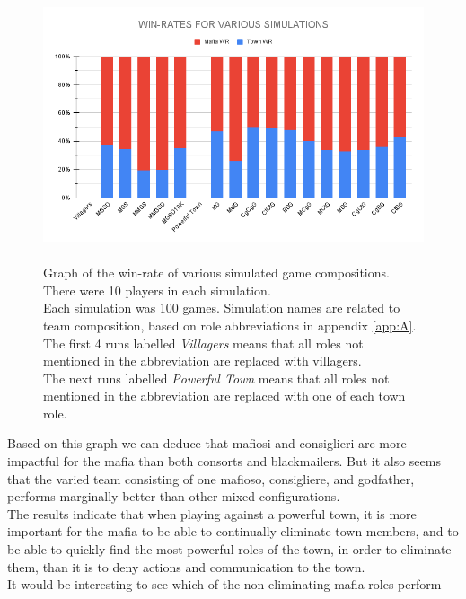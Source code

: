 \begin{figure}[H]
    \includegraphics[width=1\linewidth]{figures/Winrates}
    \caption{\\Graph of the win-rate of various simulated game compositions.\\
        There were 10 players in each simulation.\\
        Each simulation was 100 games.
        Simulation names are related to team composition, based on role
        abbreviations in appendix \ref{app:A}.\\
        The first 4 runs labelled \textit{Villagers} means that all roles not
        mentioned in the abbreviation are replaced with villagers.\\
        The next runs labelled \textit{Powerful Town} means that all roles not
        mentioned in the abbreviation are replaced with	one of each town role.}
    \label{fig:VariousSimulations}
\end{figure}
\vspace{-5px}Based on this graph we can deduce that mafiosi and
consiglieri are more
impactful for the mafia than both consorts and blackmailers. But it also seems
that the varied team consisting of one mafioso, consigliere, and godfather,
performs marginally better than other mixed configurations. \\
The results indicate  that when playing against a powerful town, it is more
important for the mafia to be able to continually eliminate town members, and to be
able to quickly find the most powerful roles of the town, in order to eliminate
them, than it is to deny actions and communication to the town. \\
It would be interesting to see which of the non-eliminating mafia roles perform
